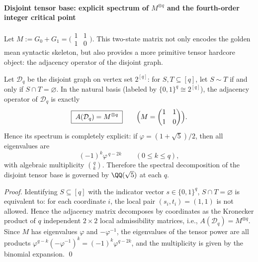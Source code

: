 \paragraph{Disjoint tensor base: explicit spectrum of \texorpdfstring{$M^{\otimes q}$}{M^⊗q} and the fourth-order integer critical point}
Let
\(
M:=G_0+G_1=\bigl(\begin{smallmatrix}1&1\\[2pt]1&0\end{smallmatrix}\bigr)
\).
This two-state matrix not only encodes the golden mean syntactic skeleton, but also provides a more primitive tensor hardcore object: the adjacency operator of the disjoint graph.

\begin{proposition}\label{prop:pom-disjointness-graph-tensor-power-spectrum}
Let \(\mathcal{D}_q\) be the disjoint graph on vertex set \(2^{[q]}\): for \(S,T\subseteq[q]\), let \(S\sim T\) if and only if \(S\cap T=\varnothing\).
In the natural basis (labeled by \(\{0,1\}^q\cong 2^{[q]}\)), the adjacency operator of \(\mathcal{D}_q\) is exactly
\[
\boxed{\;A(\mathcal{D}_q)=M^{\otimes q}\;}
\qquad\Bigl(M=\begin{pmatrix}1&1\\[2pt]1&0\end{pmatrix}\Bigr).
\]
Hence its spectrum is completely explicit: if \(\varphi=(1+\sqrt5)/2\), then all eigenvalues are
\[
(-1)^k\varphi^{\,q-2k}\qquad(0\le k\le q),
\]
with algebraic multiplicity \(\binom{q}{k}\).
Therefore the spectral decomposition of the disjoint tensor base is governed by \(\QQ(\sqrt5)\) at each \(q\).
\end{proposition}
\begin{proof}
Identifying \(S\subseteq[q]\) with the indicator vector \(s\in\{0,1\}^q\), \(S\cap T=\varnothing\) is equivalent to: for each coordinate \(i\), the local pair \((s_i,t_i)=(1,1)\) is not allowed.
Hence the adjacency matrix decomposes by coordinates as the Kronecker product of \(q\) independent \(2\times 2\) local admissibility matrices, i.e., \(A(\mathcal{D}_q)=M^{\otimes q}\).
Since \(M\) has eigenvalues \(\varphi\) and \(-\varphi^{-1}\), the eigenvalues of the tensor power are all products \(\varphi^{q-k}(-\varphi^{-1})^k=(-1)^k\varphi^{q-2k}\), and the multiplicity is given by the binomial expansion. \qed
\end{proof}


